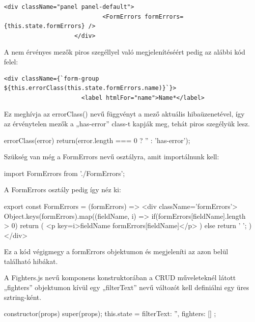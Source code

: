\begin{verbatim}
<div className="panel panel-default">
                    		<FormErrors formErrors={this.state.formErrors} />
                  	</div>
\end{verbatim}

A nem érvényes mezők piros szegéllyel való megjelenítéséért pedig az alábbi kód felel:

\begin{verbatim}
<div className={`form-group ${this.errorClass(this.state.formErrors.name)}`}>
                      <label htmlFor="name">Name*</label>
\end{verbatim}

Ez meghívja az errorClass() nevű függvényt a mező aktuális hibaüzenetével, így az érvénytelen mezők a „has-error” class-t kapják meg, tehát piros szegélyük lesz.

\begin{cpp}
errorClass(error) {
    return(error.length === 0 ? '' : 'has-error');}
\end{cpp}

Szükség van még a FormErrors nevű osztályra, amit importálnunk kell:

\begin{cpp}
import { FormErrors } from './FormErrors';
\end{cpp}

A FormErrors osztály pedig így néz ki:

\begin{cpp}
export const FormErrors = ({formErrors}) =>
  <div className='formErrors'>
    {Object.keys(formErrors).map((fieldName, i) => {
      if(formErrors[fieldName].length > 0){
        return (
          <p key={i}>{fieldName} {formErrors[fieldName]}</p>
        )        
      } else {
        return ' ';
      } })} </div>
\end{cpp}

Ez a kód végigmegy a formErrors objektumon és megjeleníti az azon belül található hibákat.


A Fighters.js nevű komponens konstruktorában a CRUD műveleteknél látott „fighters” objektumon kívül egy „filterText” nevű változót kell definiálni egy üres sztring-ként.

\begin{cpp}
constructor(props) {
    super(props);
    this.state = {
      filterText: '',
      fighters: []
    };
  }
\end{cpp}

